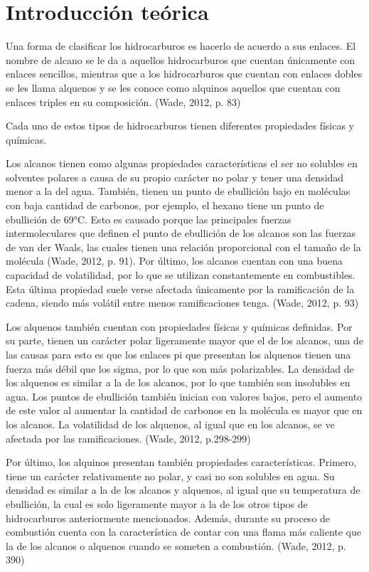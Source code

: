 
\section{Introducción teórica}

Una forma de clasificar los hidrocarburos es hacerlo de acuerdo a sus enlaces. El nombre de alcano se le da a aquellos hidrocarburos que cuentan únicamente con enlaces sencillos, mientras que a los hidrocarburos que cuentan con enlaces dobles se les llama alquenos y se les conoce como alquinos aquellos que cuentan con enlaces triples en su composición. (Wade, 2012, p. 83)

Cada uno de estos tipos de hidrocarburos tienen diferentes propiedades físicas y químicas.

Los alcanos tienen como algunas propiedades características el ser no solubles en solventes polares a causa de su propio carácter no polar y tener una densidad menor a la del agua. También, tienen un punto de ebullición bajo en moléculas con baja cantidad de carbonos, por ejemplo, el hexano tiene un punto de ebullición de 69°C. Esto es causado porque las principales fuerzas intermoleculares que definen el punto de ebullición de los alcanos son las fuerzas de van der Waals, las cuales tienen una relación proporcional con el tamaño de la molécula (Wade, 2012, p. 91). Por último, los alcanos cuentan con una buena capacidad de volatilidad, por lo que se utilizan constantemente en combustibles. Esta última propiedad suele verse afectada únicamente por la ramificación de la cadena, siendo más volátil entre menos ramificaciones tenga. (Wade, 2012, p. 93)

Los alquenos también cuentan con propiedades físicas y químicas definidas. Por su parte, tienen un carácter polar ligeramente mayor que el de los alcanos, una de las causas para esto es que los enlaces pi que presentan los alquenos tienen una fuerza más débil que los sigma, por lo que son más polarizables. La densidad de los alquenos es similar a la de los alcanos, por lo que también son insolubles en agua. Los puntos de ebullición también inician con valores bajos, pero el aumento de este valor al aumentar la cantidad de carbonos en la molécula es mayor que en los alcanos. La volatilidad de los alquenos, al igual que en los alcanos, se ve afectada por las ramificaciones. (Wade, 2012, p.298-299)

Por último, los alquinos presentan también propiedades características. Primero, tiene un carácter relativamente no polar, y casi no son solubles en agua. Su densidad es similar a la de los alcanos y alquenos, al igual que su temperatura de ebullición, la cual es solo ligeramente mayor a la de los otros tipos de hidrocarburos anteriormente mencionados. Además, durante su proceso de combustión cuenta con la característica de contar con una flama más caliente que la de los alcanos o alquenos cuando se someten a combustión. (Wade, 2012, p. 390)

